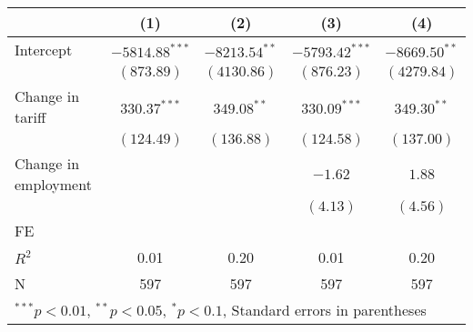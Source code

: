 
\begin{tabular}{l c c c c }
\hline
 & (1) & (2) & (3) & (4) \\
\hline
Intercept & $-5814.88^{***}$ & $-8213.54^{**}$ & $-5793.42^{***}$ & $-8669.50^{**}$ \\
            & $(873.89)$       & $(4130.86)$     & $(876.23)$       & $(4279.84)$     \\
Change in tariff     & $330.37^{***}$   & $349.08^{**}$   & $330.09^{***}$   & $349.30^{**}$   \\
            & $(124.49)$       & $(136.88)$      & $(124.58)$       & $(137.00)$      \\
Change in employment     &                  &                 & $-1.62$          & $1.88$          \\
            &                  &                 & $(4.13)$         & $(4.56)$        \\
\hline
FE          &                &                &                &                \\ 
\hline
$R^2$       & 0.01             & 0.20            & 0.01             & 0.20            \\
N           & 597              & 597             & 597              & 597             \\
\hline
\multicolumn{5}{l}{\scriptsize{$^{***}p<0.01$, $^{**}p<0.05$, $^*p<0.1$, Standard errors in parentheses}}
\end{tabular}
